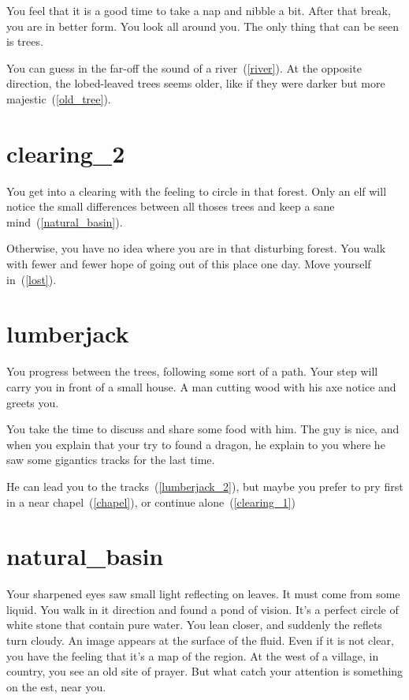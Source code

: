 You feel that it is a good time to take a nap and nibble a bit. After that
break, you are in better form. You look all around you. The only thing that can
be seen is trees.

You can guess in the far-off the sound of a river~(\ref{river}). At the opposite
direction, the lobed-leaved trees seems older, like if they were darker but more
majestic~(\ref{old_tree}).

\section{clearing_2}

You get into a clearing with the feeling to circle in that forest. Only an elf
will notice the small differences between all thoses trees and keep a sane
mind~(\ref{natural_basin}).

Otherwise, you have no idea where you are in that disturbing forest. You walk
with fewer and fewer hope of going out of this place one day. Move yourself
in~(\ref{lost}).

\section{lumberjack}

You progress between the trees, following some sort of a path. Your step will
carry you in front of a small house. A man cutting wood with his axe notice and
greets you.

You take the time to discuss and share some food with him. The guy is
nice, and when you explain that your try to found a dragon, he explain to you
where he saw some gigantics tracks for the last time.

He can lead you to the tracks~(\ref{lumberjack_2}), but maybe you prefer to pry
first in a near chapel~(\ref{chapel}), or continue alone~(\ref{clearing_1})

\section{natural_basin}

Your sharpened eyes saw small light reflecting on leaves. It must come from some
liquid. You walk in it direction and found a pond of vision. It's a perfect
circle of white stone that contain pure water. You lean closer, and suddenly the
reflets turn cloudy. An image appears at the surface of the fluid. Even if it
is not clear, you have the feeling that it's a map of the region. At the west of
a village, in country, you see an old site of prayer. But what catch your
attention is something on the est, near you.

